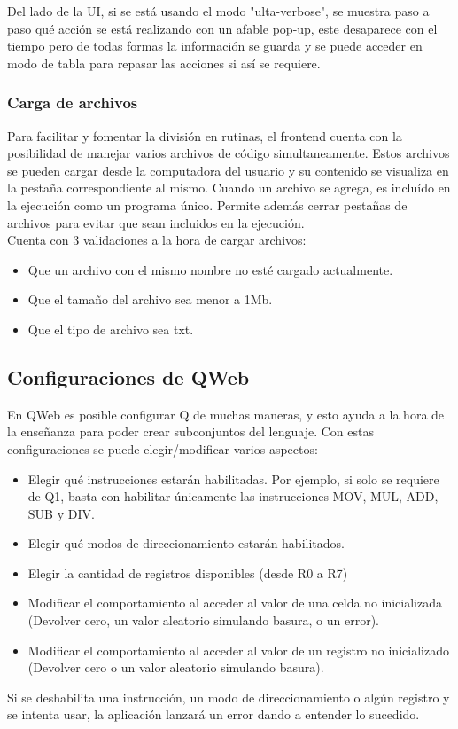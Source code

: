 \documentclass{article}
\begin{document}
Del lado de la UI, si se está usando el modo "ulta-verbose", se muestra paso a paso qué acción se está realizando con un afable pop-up, este desaparece con el tiempo pero de todas formas la información se guarda y se puede acceder en modo de tabla para repasar las acciones si así se requiere.

\subsubsection*{Carga de archivos}

Para facilitar y fomentar la división en rutinas, el frontend cuenta con la posibilidad de manejar varios archivos de código simultaneamente. Estos archivos se pueden cargar desde la computadora del usuario y su contenido se visualiza en la pestaña correspondiente al mismo. Cuando un archivo se agrega, es incluído en la ejecución como un programa único. Permite además cerrar pestañas de archivos para evitar que sean incluidos en la ejecución. \\

Cuenta con 3 validaciones a la hora de cargar archivos: 
\begin{itemize}
\item Que un archivo con el mismo nombre no esté cargado actualmente.
\item Que el tamaño del archivo sea menor a 1Mb.
\item Que el tipo de archivo sea txt.
\end{itemize}

\nopagebreak
\subsection*{Configuraciones de QWeb}
En QWeb es posible configurar Q de muchas maneras, y esto ayuda a la hora de la enseñanza para poder crear subconjuntos del lenguaje.
Con estas configuraciones se puede elegir/modificar varios aspectos:
\begin{itemize}
\item Elegir qué instrucciones estarán habilitadas. Por ejemplo, si solo se requiere de Q1, basta con habilitar únicamente las instrucciones MOV, MUL, ADD, SUB y DIV.
\item Elegir qué modos de direccionamiento estarán habilitados.
\item Elegir la cantidad de registros disponibles (desde R0 a R7)
\item Modificar el comportamiento al acceder al valor de una celda no inicializada (Devolver cero, un valor aleatorio simulando basura, o un error).
\item Modificar el comportamiento al acceder al valor de un registro no inicializado (Devolver cero o un valor aleatorio simulando basura).
\end{itemize}
Si se deshabilita una instrucción, un modo de direccionamiento o algún registro y se intenta usar, la aplicación lanzará un error dando a entender lo sucedido.
\end{document}
